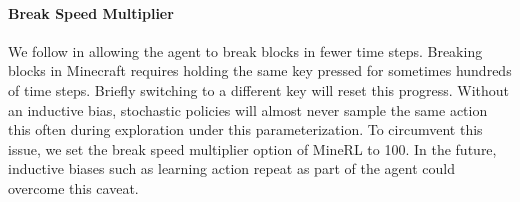 \paragraph{Break Speed Multiplier}
We follow \citet{kanitscheider2021minecraftcurriculum} in allowing the agent to break blocks in fewer time steps.
Breaking blocks in Minecraft requires holding the same key pressed for sometimes hundreds of time steps.
Briefly switching to a different key will reset this progress.
Without an inductive bias, stochastic policies will almost never sample the same action this often during exploration under this parameterization.
To circumvent this issue, we set the break speed multiplier option of MineRL to 100.
In the future, inductive biases such as learning action repeat as part of the agent \citep{park2021timeinvariantpg} could overcome this caveat.

\restoregeometry